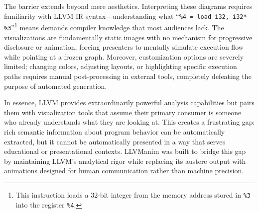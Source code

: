 The barrier extends beyond mere aesthetics. Interpreting these diagrams requires familiarity with LLVM IR syntax---understanding what ``\texttt{\%4 = load i32, i32* \%3}''\footnote{This instruction loads a 32-bit integer from the memory address stored in \texttt{\%3} into the register \texttt{\%4}.} means demands compiler knowledge that most audiences lack. The visualizations are fundamentally static images with no mechanism for progressive disclosure or animation, forcing presenters to mentally simulate execution flow while pointing at a frozen graph. Moreover, customization options are severely limited; changing colors, adjusting layouts, or highlighting specific execution paths requires manual post-processing in external tools, completely defeating the purpose of automated generation.

In essence, LLVM provides extraordinarily powerful analysis capabilities but pairs them with visualization tools that assume their primary consumer is someone who already understands what they are looking at. This creates a frustrating gap: rich semantic information about program behavior can be automatically extracted, but it cannot be automatically presented in a way that serves educational or presentational contexts. LLVManim was built to bridge this gap by maintaining LLVM's analytical rigor while replacing its austere output with animations designed for human communication rather than machine precision.
